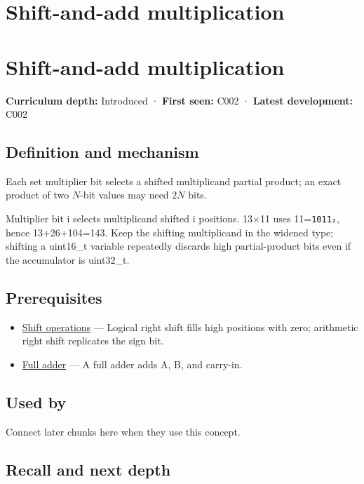 \hypertarget{appendix-a65290d66ed9}{}
\section*{Shift-and-add multiplication}
\section{Shift-and-add multiplication}\label{appendix-a65290d66ed9-shift-and-add-multiplication}

\textbf{Curriculum depth:} Introduced · \textbf{First seen:} C002 · \textbf{Latest development:} C002

\subsection{Definition and mechanism}\label{appendix-a65290d66ed9-definition-and-mechanism}

Each set multiplier bit selects a shifted multiplicand partial product; an exact product of two \(N\)-bit values may need \(2N\) bits.

Multiplier bit i selects multiplicand shifted i positions. 13×11 uses 11=\texttt{1011₂}, hence 13+26+104=143. Keep the shifting multiplicand in the widened type; shifting a uint16\_t variable repeatedly discards high partial-product bits even if the accumulator is uint32\_t.

\subsection{Prerequisites}\label{appendix-a65290d66ed9-prerequisites}

\begin{itemize}
\tightlist
\item
  \hyperref[appendix-73425b25118e]{Shift operations} --- Logical right shift fills high positions with zero; arithmetic right shift replicates the sign bit.
\item
  \hyperref[appendix-d1a5b1e520c2]{Full adder} --- A full adder adds A, B, and carry-in.
\end{itemize}

\subsection{Used by}\label{appendix-a65290d66ed9-used-by}

Connect later chunks here when they use this concept.

\subsection{Recall and next depth}\label{appendix-a65290d66ed9-recall-and-next-depth}

